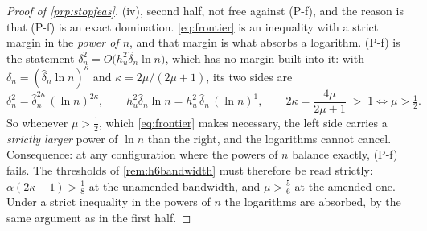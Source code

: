 \begin{proof}[Proof of \cref{prp:stopfeas}]
(iv), second half, not free against \textup{(P-f)}, and the reason is that (P-f) is an exact
domination. \eqref{eq:frontier} is an inequality with a strict margin in the \emph{power of $n$}, and
that margin is what absorbs a logarithm. (P-f) is the statement
$\delta_n^{2}=O\big(h_u^{2}\hat\delta_n\ln n\big)$, which has no margin built into it: with
$\delta_n=(\hat\delta_n\ln n)^{\kappa}$ and $\kappa=2\mu/(2\mu+1)$, its two sides are
\[
\delta_n^{2}=\hat\delta_n^{2\kappa}\,(\ln n)^{2\kappa},
\qquad
h_u^{2}\hat\delta_n\ln n=h_u^{2}\,\hat\delta_n\,(\ln n)^{1},
\qquad
2\kappa=\frac{4\mu}{2\mu+1}\;>\;1\iff\mu>\tfrac12 .
\]
So whenever $\mu>\tfrac12$, which \eqref{eq:frontier} makes necessary, the left side carries a
\emph{strictly larger} power of $\ln n$ than the right, and the logarithms cannot cancel.
Consequence: at any configuration where the powers of $n$ balance exactly, (P-f) fails. The
thresholds of \cref{rem:h6bandwidth} must therefore be read strictly:
$\alpha(2\kappa-1)>\tfrac18$ at the unamended bandwidth, and $\mu>\tfrac56$ at the amended one. Under a
strict inequality in the powers of $n$ the logarithms are absorbed, by the same argument as in the
first half.
\end{proof}

